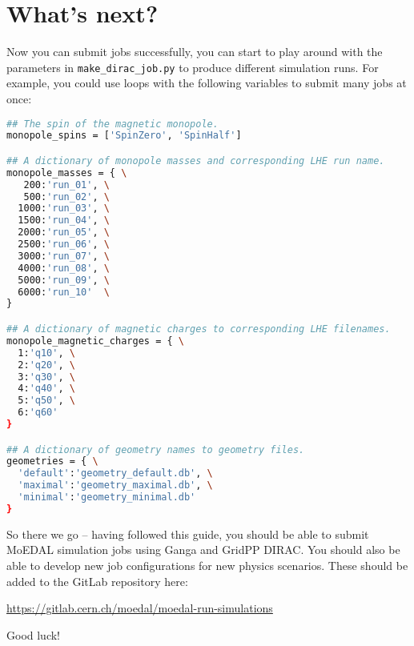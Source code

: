 \section{What's next?}
\label{sec:next}
Now you can submit jobs successfully, you can start to play
around with the parameters in \texttt{make\_dirac\_job.py}
to produce different simulation runs.
For example, you could use loops with the following variables to submit
many jobs at once:

\begin{lstlisting}[gobble=0,numbers=none,language=bash]
## The spin of the magnetic monopole.
monopole_spins = ['SpinZero', 'SpinHalf']

## A dictionary of monopole masses and corresponding LHE run name.
monopole_masses = { \
   200:'run_01', \
   500:'run_02', \
  1000:'run_03', \
  1500:'run_04', \
  2000:'run_05', \
  2500:'run_06', \
  3000:'run_07', \
  4000:'run_08', \
  5000:'run_09', \
  6000:'run_10'  \
}

## A dictionary of magnetic charges to corresponding LHE filenames.
monopole_magnetic_charges = { \
  1:'q10', \
  2:'q20', \
  3:'q30', \
  4:'q40', \
  5:'q50', \
  6:'q60'
}

## A dictionary of geometry names to geometry files.
geometries = { \
  'default':'geometry_default.db', \
  'maximal':'geometry_maximal.db', \
  'minimal':'geometry_minimal.db'
} 
\end{lstlisting}


So there we go -- having followed this guide,
you should be able to submit MoEDAL
simulation jobs using Ganga and GridPP DIRAC.
You should also be able to develop new job configurations
for new physics scenarios. These should be added to
the GitLab repository here:

\href{https://gitlab.cern.ch/moedal/moedal-run-simulations}{https://gitlab.cern.ch/moedal/moedal-run-simulations}

Good luck!
